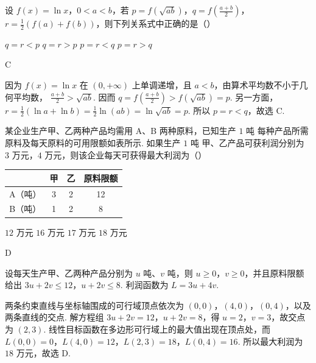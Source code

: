 \begin{problem}
设 \(f(x) = \ln x\)，\(0 < a < b\)，若 \(p = f\left(\sqrt{ab}\right)\)，\(q = f\left(\frac{a + b}{2}\right)\)，\(r = \frac{1}{2}(f(a) + f(b))\)，则下列关系式中正确的是（\quad）

\choices
    {\(q = r < p\)}
    {\(q = r > p\)}
    {\(p = r < q\)}
    {\(p = r > q\)}
\end{problem}

\begin{answer}
C
\end{answer}

\begin{solution}
因为 \(f(x)=\ln x\) 在 \((0,+\infty)\) 上单调递增，且 \(a<b\)，由算术平均数不小于几何平均数，
\(\frac{a+b}{2}>\sqrt{ab}\). 因而
\(q=f\left(\frac{a+b}{2}\right)>f\left(\sqrt{ab}\right)=p\).
另一方面，
\(r=\frac{1}{2}(\ln a+\ln b)=\frac{1}{2}\ln(ab)=\ln\sqrt{ab}=p\). 所以 \(p=r<q\)，故选 C.
\end{solution}

\begin{problem}
某企业生产甲、乙两种产品均需用 A、B 两种原料，已知生产 \(1\text{ 吨}\) 每种产品所需原料及每天原料的可用限额如表所示. 如果生产 \(1\text{ 吨}\) 甲、乙产品可获利润分别为 \(3\text{ 万元}\)，\(4\text{ 万元}\)，则该企业每天可获得最大利润为（\quad）

\begin{center}
\small
\begin{tabular}{c|ccc}
\hline
 & 甲 & 乙 & 原料限额 \\
\hline
A（吨） & 3 & 2 & 12 \\
B（吨） & 1 & 2 & 8 \\
\hline
\end{tabular}
\end{center}

\choices
    {\(12\text{ 万元}\)}
    {\(16\text{ 万元}\)}
    {\(17\text{ 万元}\)}
    {\(18\text{ 万元}\)}
\end{problem}

\begin{answer}
D
\end{answer}

\begin{solution}
设每天生产甲、乙两种产品分别为 \(u\) 吨、\(v\) 吨，则 \(u\geqslant0\)，\(v\geqslant0\)，并且原料限额给出
\(3u+2v\leqslant12\)，\(u+2v\leqslant8\). 利润函数为 \(L=3u+4v\).

两条约束直线与坐标轴围成的可行域顶点依次为 \((0,0)\)，\((4,0)\)，\((0,4)\)，以及两条直线的交点. 解方程组
\(3u+2v=12\)，\(u+2v=8\)，得 \(u=2\)，\(v=3\)，故交点为 \((2,3)\). 线性目标函数在多边形可行域上的最大值出现在顶点处，而
\(L(0,0)=0\)，\(L(4,0)=12\)，\(L(2,3)=18\)，\(L(0,4)=16\). 所以最大利润为 \(18\text{ 万元}\)，故选 D.
\end{solution}


